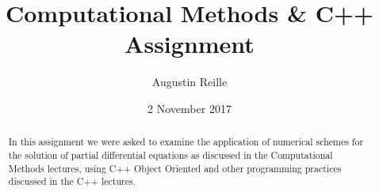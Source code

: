 \documentclass{report}
\title{Computational Methods & C++ Assignment}
\author{Augustin Reille}
\date{2 November 2017}
\begin{document}
    \begin{titlepage}
    \maketitle
    \end{titlepage}

    \tableofcontents







    \begin{abstract}
        In this assignment we were asked to examine the application of numerical schemes
        for the solution of partial differential equations as discussed in the Computational
         Methods lectures, using C++ Object Oriented and other programming practices discussed in the C++ lectures.
    \end{abstract}

















\end{document}
